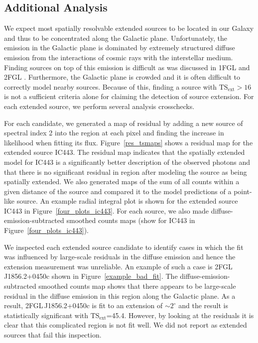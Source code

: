 \documentclass[12pt,preprint]{aastex}
\newcommand{\gev}{\text{GeV}\xspace}
\newcommand{\tsext}{{\ensuremath{\text{TS}_{\text{ext}}}}\xspace}
\newcommand{\ts}{\text{TS}\xspace}
\newcommand{\degree}{^\circ\xspace}
\begin{document}
\subsection{Additional Analysis}

We expect most spatially resolvable extended sources to be located
in our Galaxy and thus to be concentrated along the Galactic plane.
Unfortunately, the \gev emission in the Galactic plane is dominated by
extremely structured diffuse emission from the interactions of cosmic rays
with the interstellar medium.  Finding sources on top of this emission
is difficult as was discussed in 1FGL
and 2FGL \citep{first_cat,second_cat}.  Furthermore, the Galactic plane
is crowded and it is often difficult to correctly model nearby sources.
Because of this, finding a source with $\tsext>16$ is not a sufficient
criteria alone for claiming the detection of source extension.  For each
extended source, we perform several analysis crosschecks.

For each candidate, we generated a map of residual \ts by adding a new
source of spectral index 2 into the region at each pixel and finding the
increase in likelihood when fitting its flux. Figure~\ref{res_tsmaps}
shows a residual \ts map for the extended source IC443.  The residual
\ts map indicates that the spatially extended model for IC443 is a
significantly better description of the observed photons
and that there is no significant residual in region after modeling
the source as being spatially extended.  We also
generated maps of the sum of all counts within a given distance of
the source and compared it to the model predictions of a point-like source.
An example radial integral plot is shown for the extended source
IC443 in Figure~\ref{four_plots_ic443}.  For each source, we also made
diffuse-emission-subtracted smoothed counts maps (show for IC443 in
Figure~\ref{four_plots_ic443}).

We inspected each extended source candidate to identify cases in
which the fit was influenced by large-scale residuals in
the diffuse emission and hence the extension measurement was unreliable.
An example of such a case is 
2FGL\,J1856.2+0450c 
shown in Figure~\ref{example_bad_fit}. The
diffuse-emission-subtracted smoothed
counts map shows that
there appears to be large-scale
residual in the diffuse emission
in this region along the Galactic plane.
As a result, 2FGL\,J1856.2+0450c is fit
to an extension of $\sim2\degree$ and the result is statistically significant
with \tsext=45.4. However, by looking at the residuals it is clear
that this complicated region is not fit well.
We did not report as extended sources that fail this inspection.
\end{document}
